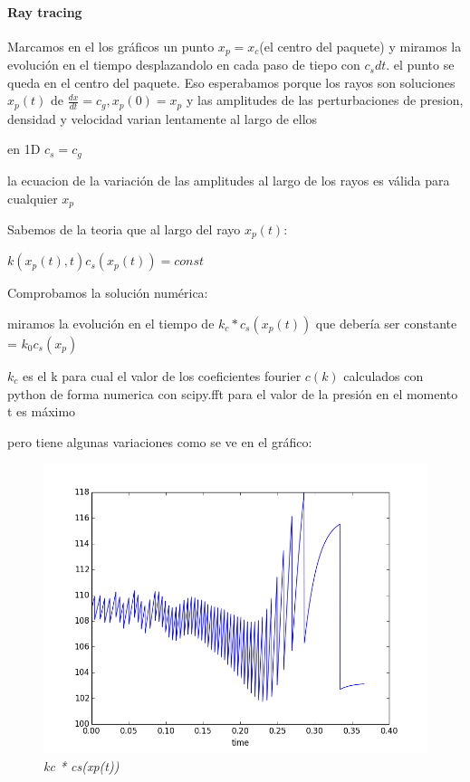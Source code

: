 \documentclass{article}
\begin{document}
\newpage

\paragraph{Ray tracing}

\begin{description}
\item Marcamos en el los gráficos un punto $x_p = x_c$(el centro del paquete) y miramos la evolución en el tiempo desplazandolo en cada paso de tiepo con $c_s dt$. el punto se queda en el centro del paquete. Eso esperabamos porque los rayos son soluciones 
$x_p(t)$ de $\frac{dx}{dt} = c_g, x_p(0) = x_p$ y las amplitudes de las perturbaciones de presion, densidad y velocidad varian lentamente al largo de ellos  
\item en 1D $c_s=c_g$
\item la ecuacion de la variación de las amplitudes al largo de los rayos es válida para cualquier $x_p$

\item Sabemos de la teoria que al largo del rayo $x_p(t)$:
\item $k(x_p(t),t)  c_s(x_p(t)) = const$ 
\item Comprobamos la solución numérica: 
\item miramos la evolución en el tiempo de $k_c * c_s(x_p(t)) $ que debería ser constante = $k_0 c_s(x_p)$ 
\item  $k_c$ es el k para cual el valor de los coeficientes fourier $c(k)$ calculados con python 
de forma numerica con scipy.fft para el valor de la presión en el momento t es máximo 
\item pero tiene algunas variaciones como se ve en el gráfico:


\item \begin{figure}[!ht]
 \centering
 \includegraphics[scale=0.5]{kcinhom1.png}
 \caption{\emph{kc * cs(xp(t))}}
\end{figure}



\end{description}
\end{document}
